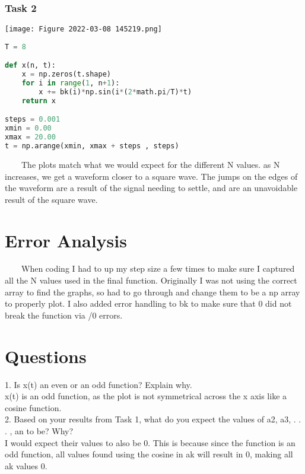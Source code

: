 \documentclass[11pt,a4]{article}
\begin{document}
\subsubsection{Task 2}

\texttt{[image: Figure 2022-03-08 145219.png]}

\begin{lstlisting}[language=Python]
T = 8

def x(n, t):
    x = np.zeros(t.shape)
    for i in range(1, n+1):
        x += bk(i)*np.sin(i*(2*math.pi/T)*t)
    return x

steps = 0.001
xmin = 0.00
xmax = 20.00
t = np.arange(xmin, xmax + steps , steps)
\end{lstlisting}

\ \ \ \ The plots match what we would expect for the different N values. as N increases, we get a waveform closer to a square wave. The jumps on the edges of the waveform are a result of the signal needing to settle, and are an unavoidable result of the square wave.

\section{Error Analysis}
\ \ \ \ When coding I had to up my step size a few times to make sure I captured all the N values used in the final function. Originally I was not using the correct array to find the graphs, so had to go through and change them to be a np array to properly plot. I also added error handling to bk to make sure that 0 did not break the function via /0 errors.

\section{Questions}

1. Is x(t) an even or an odd function? Explain why.\\

x(t) is an odd function, as the plot is not symmetrical across the x axis like a cosine function.\\

2. Based on your results from Task 1, what do you expect the values of a2, a3, . . . , an to be? Why?\\

I would expect their values to also be 0. This is because since the function is an odd function, all values found using the cosine in ak will result in 0, making all ak values 0.\\
\end{document}
